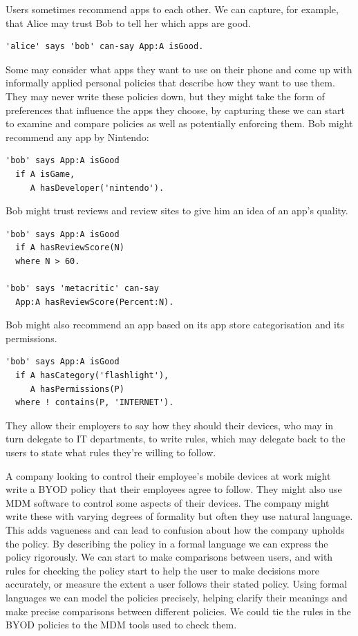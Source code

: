 \documentclass[thesis.tex]{subfiles}
\begin{document}
Users sometimes recommend apps to each other. We can capture, for example, that
Alice may trust Bob to tell her which apps are good.
%
\begin{lstlisting}
'alice' says 'bob' can-say App:A isGood.
\end{lstlisting}
%
Some may consider what apps they want to use on their phone and come up with
informally applied personal policies that describe how they want to use them.
They may never write these policies down, but they might take the form of
preferences that influence the apps they choose, by capturing these we can start
to examine and compare policies as well as potentially enforcing them. Bob might recommend any app by Nintendo:
%
\begin{lstlisting}
'bob' says App:A isGood
  if A isGame,
     A hasDeveloper('nintendo').
\end{lstlisting}
%
Bob might trust reviews and review sites to give him an idea of an app's quality. 
%
\begin{lstlisting}
'bob' says App:A isGood
  if A hasReviewScore(N)
  where N > 60.
 
'bob' says 'metacritic' can-say
  App:A hasReviewScore(Percent:N).
\end{lstlisting}
%
Bob might also recommend an app based on its app store categorisation and its permissions.
%
\begin{lstlisting}
'bob' says App:A isGood
  if A hasCategory('flashlight'),
     A hasPermissions(P)
  where ! contains(P, 'INTERNET').
\end{lstlisting}

They allow their employers to say how they should their devices, who
may in turn delegate to IT departments, to write rules, which may
delegate back to the users to state what rules they're willing to
follow.

A company looking to control their employee's mobile devices at work
might write a \ac{BYOD} policy that their employees agree to
follow. They might also use \ac{MDM} software to control some aspects
of their devices. The company might write these with varying degrees
of formality but often they use natural language. This adds vagueness
and can lead to confusion about how the company upholds the policy. By
describing the policy in a formal language we can express the policy
rigorously. We can start to make comparisons between users, and with
rules for checking the policy start to help the user to make decisions
more accurately, or measure the extent a user follows their stated
policy. Using formal languages we can model the policies precisely,
helping clarify their meanings and make precise comparisons between
different policies. We could tie the rules in the \ac{BYOD} policies
to the \ac{MDM} tools used to check them.
\end{document}
